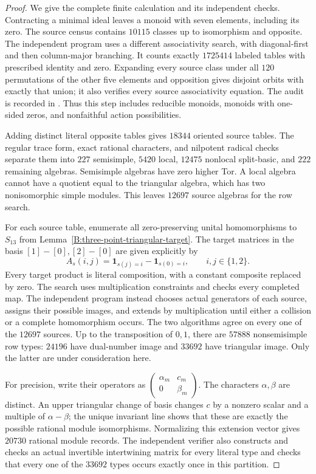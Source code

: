 \begin{proof}
We give the complete finite calculation and its independent checks.
Contracting a minimal ideal leaves a monoid with seven elements,
including its zero.  The source census
contains $10115$ classes up to isomorphism and opposite.
The independent program  uses a
different associativity search, with diagonal-first and then
column-major branching.  It counts exactly $1725414$ labeled
tables with prescribed identity and zero.  Expanding every source
class under all $120$ permutations of the other five elements and
opposition gives disjoint orbits with exactly that union; it also
verifies every source associativity equation.
The audit is recorded in
.
Thus this step includes reducible monoids, monoids with one-sided
zeros, and nonfaithful action possibilities.

Adding distinct literal opposite tables gives $18344$ oriented
source tables.  The regular trace form, exact rational characters,
and nilpotent radical checks separate them into $227$ semisimple,
$5420$ local, $12475$ nonlocal split-basic, and $222$ remaining
algebras.  Semisimple algebras have zero higher Tor.  A local algebra
cannot have a quotient equal to the triangular algebra, which has
two nonisomorphic simple modules.  This leaves $12697$ source
algebras for the row search.

For each source table, enumerate all zero-preserving unital
homomorphisms to $S_{13}$ from
Lemma~\ref{B:three-point-triangular-target}.  The target matrices
in the basis $[1]-[0],[2]-[0]$ are given explicitly by
\[
 A_s(i,j)=\mathbf1_{s(j)=i}-\mathbf1_{s(0)=i},
 \qquad i,j\in\{1,2\}.
\]
Every target product is literal composition, with a constant
composite replaced by zero.  The search
uses multiplication constraints and checks every completed map.
The independent program
instead chooses actual generators of each source, assigns their
possible images, and extends by multiplication until either a
collision or a complete homomorphism occurs.  The two algorithms
agree on every one of the $12697$ sources.  Up to the transposition
of $0,1$, there are $57888$ nonsemisimple row types: $24196$ have
dual-number image and $33692$ have triangular image.  Only the
latter are under consideration here.

For precision, write their operators as
$\left(\begin{smallmatrix}\alpha_m&c_m\\0&\beta_m\end{smallmatrix}\right)$.
The characters $\alpha,\beta$ are distinct.  An upper triangular
change of basis changes $c$ by a nonzero scalar and a multiple of
$\alpha-\beta$; the unique invariant line shows that these are
exactly the possible rational module isomorphisms.  Normalizing
this extension vector gives $20730$ rational module records.
The independent verifier also constructs and checks an actual
invertible intertwining matrix for every literal type and checks
that every one of the $33692$ types occurs exactly once in this
partition.


\end{proof}
